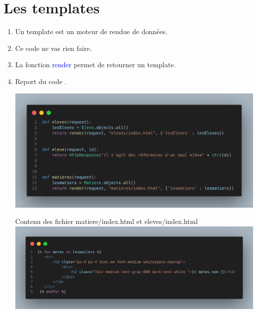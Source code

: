 \documentclass[10pt,a4paper]{article}
\begin{document}
\section{Les templates}
\begin{enumerate}
\item Un template est un moteur de rendue de données.
\item Ce code ne vas rien faire.
\item La fonction \textcolor{blue}{render} permet de retourner un template. 

\item Report du code .\\
\begin{center}
\includegraphics[scale=0.23]{4.png}
\end{center}

Contenu des fichier matiere/index.html et eleves/index.html\\

\includegraphics[scale=0.21]{5.png}
\end{enumerate}
\end{document}

